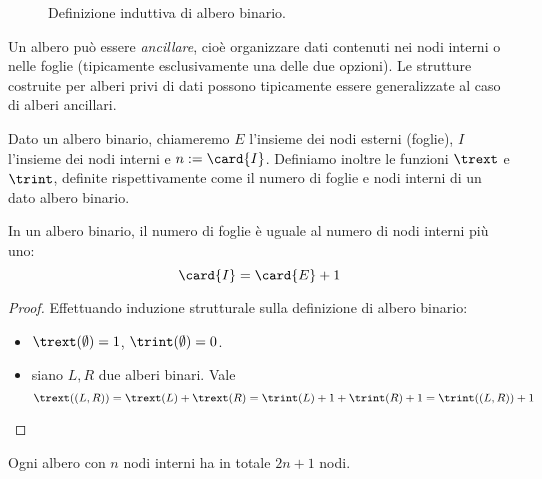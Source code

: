 \begin{figure}
	
	\caption{Definizione induttiva di albero binario.}
	\label{fig:btree_inductive}
\end{figure}

Un albero può essere \emph{ancillare}, cioè organizzare dati contenuti nei nodi interni o nelle foglie (tipicamente esclusivamente una delle due opzioni). Le strutture costruite per alberi privi di dati possono tipicamente essere generalizzate al caso di alberi ancillari.

Dato un albero binario, chiameremo $E$ l'insieme dei nodi esterni (foglie), $I$ l'insieme dei nodi interni e $n:=\card{I}$.
Definiamo inoltre le funzioni $\trext$ e $\trint$, definite rispettivamente come il numero di foglie e nodi interni di un dato albero binario.

\begin{theorem}\label{thm:btree_leaves}
	In un albero binario, il numero di foglie è uguale al numero di nodi interni più uno:
	\begin{equation*}
		\card{I}=\card{E}+1
	\end{equation*}
\end{theorem}
\begin{proof}
	Effettuando induzione strutturale sulla definizione di albero binario:
	\begin{itemize}
		\item $\trext(\emptyset)=1$, $\trint(\emptyset)=0$.
		\item siano $L, R$ due alberi binari. Vale
		      \begin{equation*}
			      \trext((L,R)) = \trext(L) + \trext(R) = \trint(L) + 1 + \trint(R) + 1 = \trint((L, R))  + 1
		      \end{equation*}
	\end{itemize}
\end{proof}

\begin{corollario}
	Ogni albero con $n$ nodi interni ha in totale $2n+1$ nodi.
\end{corollario}


